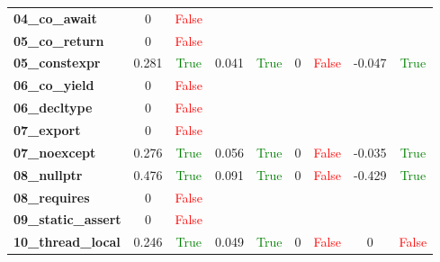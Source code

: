 \documentclass{article}
\begin{document}
\begin{xltabular}{\textwidth}{lcccccccc}
\textbf{04\_co\_await}& 0&\textcolor{red}{False} \\[0.5ex]
\textbf{05\_co\_return}& 0&\textcolor{red}{False} \\[0.5ex]
\textbf{05\_constexpr}& 0.281&\textcolor{green}{True}& 0.041&\textcolor{green}{True}& 0&\textcolor{red}{False}& -0.047&\textcolor{green}{True} \\[0.5ex]
\textbf{06\_co\_yield}& 0&\textcolor{red}{False} \\[0.5ex]
\textbf{06\_decltype}& 0&\textcolor{red}{False} \\[0.5ex]
\textbf{07\_export}& 0&\textcolor{red}{False} \\[0.5ex]
\textbf{07\_noexcept}& 0.276&\textcolor{green}{True}& 0.056&\textcolor{green}{True}& 0&\textcolor{red}{False}& -0.035&\textcolor{green}{True} \\[0.5ex]
\textbf{08\_nullptr}& 0.476&\textcolor{green}{True}& 0.091&\textcolor{green}{True}& 0&\textcolor{red}{False}& -0.429&\textcolor{green}{True} \\[0.5ex]
\textbf{08\_requires}& 0&\textcolor{red}{False} \\[0.5ex]
\textbf{09\_static\_assert}& 0&\textcolor{red}{False} \\[0.5ex]
\textbf{10\_thread\_local}& 0.246&\textcolor{green}{True}& 0.049&\textcolor{green}{True}& 0&\textcolor{red}{False}& 0&\textcolor{red}{False} \\[0.5ex]
\bottomrule
\end{xltabular}
\end{document}
